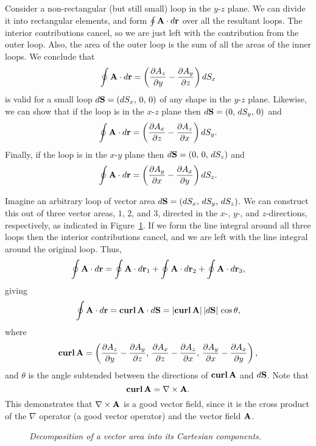 Consider a non-rectangular (but still small) loop in the $y$-$z$ plane.
We can divide it into rectangular
 elements, and form $\oint {\bf A}\cdot d{\bf r}$ over all the resultant 
loops. The interior 
contributions cancel, so we are just left with the contribution from the outer loop.
Also, the area of the outer loop is the sum of all the areas of the inner loops.
We conclude that 
\begin{equation}
\oint {\bf A} \cdot d{\bf r} = \left(\frac{\partial A_z}{\partial y}-
\frac{\partial A_y}{\partial z}\right) dS_x
\end{equation}
is valid for a small loop 
$d{\bf S} = (dS_x,\,0,\,0)$ of any shape in the $y$-$z$ plane. Likewise, we can show that
if the loop is in the $x$-$z$ plane then $d{\bf S} = (0,\,dS_y,\,0)$ and
\begin{equation}
\oint {\bf A} \cdot d{\bf r} = \left(\frac{\partial A_x}{\partial z}-
\frac{\partial A_z}{\partial x}\right) dS_y.
\end{equation}
Finally, if the loop is in the $x$-$y$ plane then $d{\bf S} = (0,\,0,\,dS_z)$ and
\begin{equation}
\oint {\bf A} \cdot d{\bf r} = \left(\frac{\partial A_y}{\partial x}-
\frac{\partial A_x}{\partial y}\right) dS_z.
\end{equation}

Imagine an arbitrary loop of vector area $d{\bf S} = (dS_x, \,dS_y, \,dS_z)$. We
can construct this out of three vector areas, $1$, $2$, and $3$, directed in the $x$-, $y$-, and $z$-directions, respectively, as
indicated in Figure~\ref{f22}.
If we form the line integral around all three loops then the interior contributions
cancel, and we are left with the line integral around the original loop. Thus,
\begin{equation}
\oint {\bf A} \cdot d{\bf r} = \oint {\bf A}\cdot d{\bf r}_1 +
\oint {\bf A}\cdot d{\bf r}_2+\oint {\bf A}\cdot d{\bf r}_3,
\end{equation}
giving
\begin{equation}\label{e2145}
\oint {\bf A}\cdot d{\bf r} = {\bf curl}\,{\bf A} \cdot d{\bf S} = 
|{\bf curl}\,{\bf A}|\,|d {\bf S}|\,\cos\theta,
\end{equation}
where
\begin{equation}
{\bf curl}\,{\bf A} = \left(\frac{\partial A_z}{\partial y}- \frac{\partial A_y}
{\partial z},\, \frac{\partial A_x}{\partial z}- \frac{\partial A_z}
{\partial x},\, \frac{\partial A_y}{\partial x}- \frac{\partial A_x}
{\partial y}\right),
\end{equation}
and $\theta$ is the angle subtended between the directions of ${\bf curl}\,{\bf A}$ and $d{\bf S}$. 
Note that
\begin{equation}
{\bf curl}\,{\bf A} = \nabla\times {\bf A}.
\end{equation}
This demonstrates that $\nabla\times {\bf A}$ is a good vector field, since it is
the cross product of the $\nabla$ operator (a good vector operator) and 
the vector field ${\bf A}$.
\begin{figure}
\epsfysize=2.5in
\centerline{}
\caption{\em Decomposition of a vector area into its Cartesian components.}\label{f22}
\end{figure}

